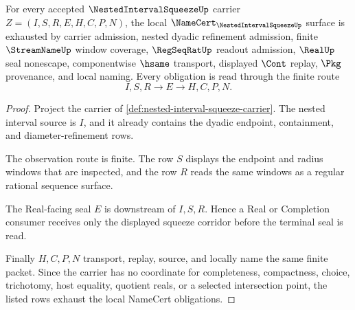 \begin{theorem}
\label{thm:nested-interval-squeeze-namecert-obligations}
For every accepted $\NestedIntervalSqueezeUp$ carrier $Z=(I,S,R,E,H,C,P,N)$, the local $\NameCert_{\NestedIntervalSqueezeUp}$ surface is exhausted by carrier admission, nested dyadic refinement admission, finite $\StreamNameUp$ window coverage, $\RegSeqRatUp$ readout admission, $\RealUp$ seal nonescape, componentwise $\hsame$ transport, displayed $\Cont$ replay, $\Pkg$ provenance, and local naming. Every obligation is read through the finite route
$$
I,S,R \longrightarrow E \longrightarrow H,C,P,N .
$$
\end{theorem}
\begin{proof}
Project the carrier of \autoref{def:nested-interval-squeeze-carrier}. The nested interval source is $I$, and it already contains the dyadic endpoint, containment, and diameter-refinement rows.

The observation route is finite. The row $S$ displays the endpoint and radius windows that are inspected, and the row $R$ reads the same windows as a regular rational sequence surface.

The Real-facing seal $E$ is downstream of $I,S,R$. Hence a Real or Completion consumer receives only the displayed squeeze corridor before the terminal seal is read.

Finally $H,C,P,N$ transport, replay, source, and locally name the same finite packet. Since the carrier has no coordinate for completeness, compactness, choice, trichotomy, host equality, quotient reals, or a selected intersection point, the listed rows exhaust the local NameCert obligations.
\end{proof}

